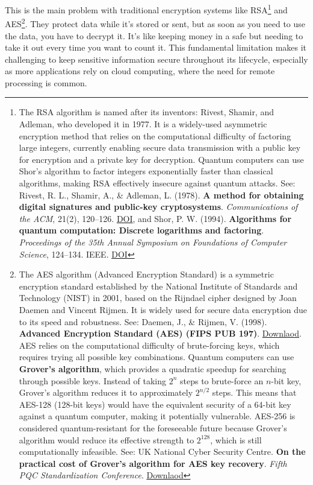 \documentclass[
  letterpaper,
  DIV=11,
  numbers=noendperiod,
  oneside]{scrartcl}
\begin{document}
This is the main problem with traditional encryption systems like
RSA\footnote{The RSA algorithm is named after its inventors: Rivest,
  Shamir, and Adleman, who developed it in 1977. It is a widely-used
  asymmetric encryption method that relies on the computational
  difficulty of factoring large integers, currently enabling secure data
  transmission with a public key for encryption and a private key for
  decryption. Quantum computers can use Shor's algorithm to factor
  integers exponentially faster than classical algorithms, making RSA
  effectively insecure against quantum attacks. See: Rivest, R. L.,
  Shamir, A., \& Adleman, L. (1978). \textbf{A method for obtaining
  digital signatures and public-key cryptosystems}. \emph{Communications
  of the ACM}, 21(2), 120--126.
  \href{https://doi.org/10.1145/359340.359342}{DOI}, and Shor, P. W.
  (1994). \textbf{Algorithms for quantum computation: Discrete
  logarithms and factoring}. \emph{Proceedings of the 35th Annual
  Symposium on Foundations of Computer Science}, 124--134. IEEE.
  \href{https://doi.org/10.1109/SFCS.1994.365700}{DOI}} and
AES\footnote{The AES algorithm (Advanced Encryption Standard) is a
  symmetric encryption standard established by the National Institute of
  Standards and Technology (NIST) in 2001, based on the Rijndael cipher
  designed by Joan Daemen and Vincent Rijmen. It is widely used for
  secure data encryption due to its speed and robustness. See: Daemen,
  J., \& Rijmen, V. (1998). \textbf{Advanced Encryption Standard (AES)
  (FIPS PUB 197)}.
  \href{https://csrc.nist.gov/publications/fips/fips197/fips-197.pdf}{Downlaod}.
  AES relies on the computational difficulty of brute-forcing keys,
  which requires trying all possible key combinations. Quantum computers
  can use \textbf{Grover's algorithm}, which provides a quadratic
  speedup for searching through possible keys. Instead of taking \(2^n\)
  steps to brute-force an \(n\)-bit key, Grover's algorithm reduces it
  to approximately \(2^{n/2}\) steps. This means that AES-128 (128-bit
  keys) would have the equivalent security of a 64-bit key against a
  quantum computer, making it potentially vulnerable. AES-256 is
  considered quantum-resistant for the foreseeable future because
  Grover's algorithm would reduce its effective strength to \(2^{128}\),
  which is still computationally infeasible. See: UK National Cyber
  Security Centre. \textbf{On the practical cost of Grover's algorithm
  for AES key recovery}. \emph{Fifth PQC Standardization Conference}.
  \href{https://csrc.nist.gov/csrc/media/Events/2024/fifth-pqc-standardization-conference/documents/papers/on-practical-cost-of-grover.pdf}{Downlaod}}.
They protect data while it's stored or sent, but as soon as you need to
use the data, you have to decrypt it. It's like keeping money in a safe
but needing to take it out every time you want to count it. This
fundamental limitation makes it challenging to keep sensitive
information secure throughout its lifecycle, especially as more
applications rely on cloud computing, where the need for remote
processing is common.
\end{document}
